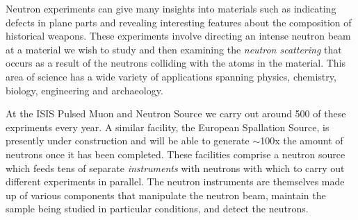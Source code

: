 Neutron experiments can give many insights into materials such as indicating defects in plane parts and revealing interesting features about the composition of historical weapons. These experiments involve directing an intense neutron beam at a material we wish to study and then examining the \textit{neutron scattering} that occurs as a result of the neutrons colliding with the atoms in the material. This area of science has a wide variety of applications spanning physics, chemistry, biology, engineering and archaeology.

At the ISIS Pulsed Muon and Neutron Source we carry out around 500 of these expriments every year. A similar facility, the European Spallation Source, is presently under construction and will be able to generate $\sim$100x the amount of neutrons once it has been completed. These facilities comprise a neutron source which feeds tens of separate \textit{instruments} with neutrons with which to carry out different experiments in parallel. The neutron instruments are themselves made up of various components that manipulate the neutron beam, maintain the sample being studied in particular conditions, and detect the neutrons. 

